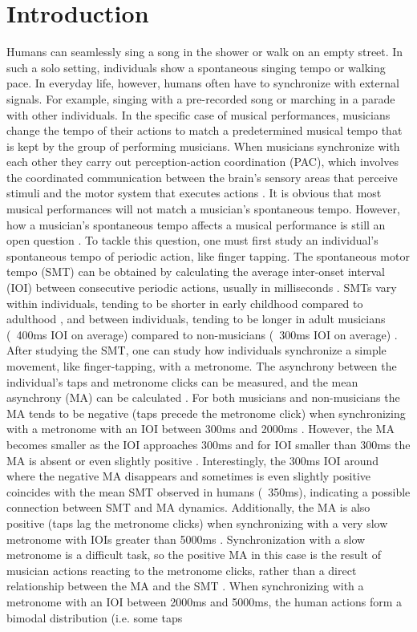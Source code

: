 \documentclass{report}
\begin{document}
\section{Introduction}
Humans can seamlessly sing a song in the shower or walk on an empty street. In such a solo setting, individuals show a spontaneous singing tempo or walking pace. In everyday life, however, humans often have to synchronize with external signals. For example, singing with a pre-recorded song or marching in a parade with other individuals. In the specific case of musical performances, musicians change the tempo of their actions to match a predetermined musical tempo that is kept by the group of performing musicians. When musicians synchronize with each other they carry out perception-action coordination (PAC), which involves the coordinated communication between the brain’s sensory areas that perceive stimuli and the motor system that executes actions \cite{ridderinkhof2014neurocognitive}. It is obvious that most musical performances will not match a musician’s spontaneous tempo. However, how a musician’s spontaneous tempo affects a musical performance is still an open question \cite{zamm2018musicians}. To tackle this question, one must first study an individual’s spontaneous tempo of periodic action, like finger tapping. The spontaneous motor tempo (SMT) can be obtained by calculating the average inter-onset interval (IOI) between consecutive periodic actions, usually in milliseconds \cite{mcauley2006time}. SMTs vary within individuals, tending to be shorter in early childhood compared to adulthood \cite{mcauley2006time}, and between individuals, tending to be longer in adult musicians (~400ms IOI on average) compared to non-musicians (~300ms IOI on average) \cite{scheurich2016spontaneous, drake2000tapping}. After studying the SMT, one can study how individuals synchronize a simple movement, like finger-tapping, with a metronome. The asynchrony between the individual's taps and metronome clicks can be measured, and the mean asynchrony (MA) can be calculated \cite{repp2005sensorimotor, repp2013sensorimotor}. For both musicians and non-musicians the MA tends to be negative (taps precede the metronome click) when synchronizing with a metronome with an IOI between 300ms and 2000ms \cite{mates1994temporal}. However, the MA becomes smaller as the IOI approaches 300ms and for IOI smaller than 300ms the MA is absent or even slightly positive \cite{repp2003rate, wohlschlager1999synchronization}. Interestingly, the 300ms IOI around where the negative MA disappears and sometimes is even slightly positive coincides with the mean SMT observed in humans (~350ms), indicating a possible connection between SMT and MA dynamics. Additionally, the MA is also positive (taps lag the metronome clicks) when synchronizing with a very slow metronome with IOIs greater than 5000ms \cite{miyake2004two}. Synchronization with a slow metronome is a difficult task, so the positive MA in this case is the result of musician actions reacting to the metronome clicks, rather than a direct relationship between the MA and the SMT \cite{repp2007tapping}. When synchronizing with a metronome with an IOI between 2000ms and 5000ms, the human actions form a bimodal distribution (i.e. some taps 
\end{document}
